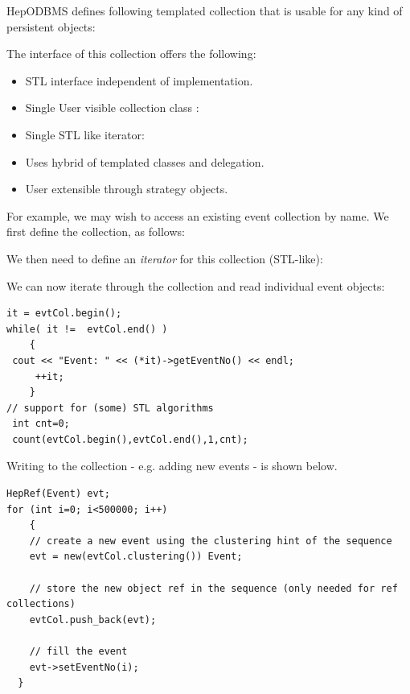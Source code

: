 \par
 HepODBMS defines following templated collection that is usable for any kind of persistent objects:
\par
{}
\par

The interface of this collection offers the following: 
\begin{itemize}

\item STL interface independent of implementation.
\item Single User visible collection class : 
\item Single STL like iterator: 
\item Uses hybrid of templated classes and delegation.
\item User extensible through strategy objects.\end{itemize}

\par

For example, we may wish to access an existing event collection
by name. We first define the collection, as follows:
\par
{}
\par
We then need to define an \emph{iterator} for this collection (STL-like):
\par
{}
\par
We can now iterate through the collection and read individual
event objects:
\begin{verbatim}
it = evtCol.begin(); 
while( it !=  evtCol.end() ) 
    { 
 cout << "Event: " << (*it)->getEventNo() << endl; 
     ++it; 
    } 
// support for (some) STL algorithms 
 int cnt=0; 
 count(evtCol.begin(),evtCol.end(),1,cnt);

\end{verbatim}

\par
Writing to the collection - e.g. adding new events - is shown below.
\begin{verbatim}
HepRef(Event) evt; 
for (int i=0; i<500000; i++) 
    { 
    // create a new event using the clustering hint of the sequence 
    evt = new(evtCol.clustering()) Event; 
  
    // store the new object ref in the sequence (only needed for ref collections) 
    evtCol.push_back(evt); 

    // fill the event 
    evt->setEventNo(i); 
  }
\end{verbatim}

